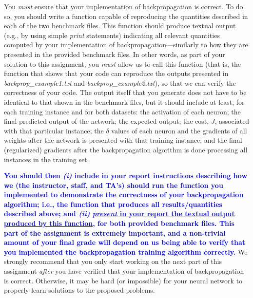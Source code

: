 \documentclass[letterpaper]{article}
\newcommand{\HIGHLIGHT}[1]{\textcolor{blue}{\textbf{#1}}}
\begin{document}
You \textit{must} ensure that your implementation of backpropagation is correct. To do so, you should write a function capable of reproducing the quantities described in each of the two benchmark files. This function should produce textual output (e.g., by using simple \textit{print} statements) indicating all relevant quantities computed by your implementation of backpropagation---similarly to how they are presented in the provided benchmark files. In other words, as part of your solution to this assignment, you \textit{must} allow us to call this function (that is, the function that shows that your code can reproduce the outputs presented in \emph{backprop\_example1.txt} and \emph{backprop\_example2.txt}), so that we can verify the correctness of your code. The output itself that you generate does not have to be identical to that shown in the benchmark files, but it should include at least, for each training instance and for both datasets: the activation of each neuron; the final predicted output of the network; the expected output; the cost, $J$, associated with that particular instance; the $\delta$ values of each neuron and the gradients of all weights after the network is presented with that training instance; and the final (regularized) gradients after the backpropagation algorithm is done processing all instances in the training set.

\HIGHLIGHT{You should then \textit{(i)} include in your report instructions describing how we (the instructor, staff, and TA's) should run the function you implemented to demonstrate the correctness of your backpropagation algorithm; i.e., the function that produces all results/quantities described above; and \textit{(ii)} \ul{\textit{present} in your report the textual output produced by this function}, for both provided benchmark files. This part of the assignment is extremely important, and a non-trivial amount of your final grade will depend on us being able to verify that you implemented the backpropagation training algorithm correctly.} We strongly recommend that you only start working on the next part of this assignment \textit{after} you have verified that your implementation of backpropagation is correct. Otherwise, it may be hard (or impossible) for your neural network to properly learn solutions to the proposed problems. 
\end{document}
